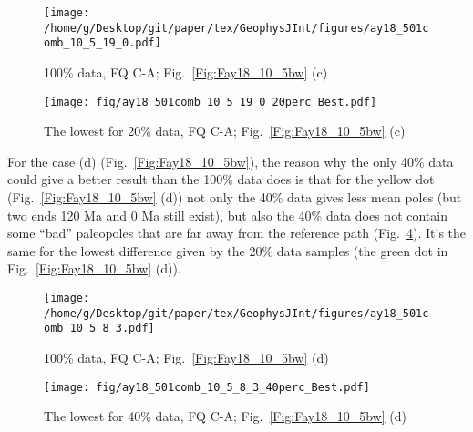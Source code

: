 \begin{figure*}[tbp]
  \captionsetup[subfigure]{labelformat=empty,aboveskip=-6pt,belowskip=-6pt}
  \centering
  \begin{subfigure}[htbp]{.49\textwidth}
    \captionsetup{skip=0pt}
    \centering
    \texttt{[image: /home/g/Desktop/git/paper/tex/GeophysJInt/figures/ay18\_501comb\_10\_5\_19\_0.pdf]}
	\caption{100\% data, FQ C-A; Fig.~\ref{Fig:Fay18_10_5bw}
	(c)}\label{Fig:Fay18_10_5b501_}
  \end{subfigure}
  \begin{subfigure}[htbp]{.49\textwidth}
    \captionsetup{skip=0pt}
    \centering
    \texttt{[image: fig/ay18\_501comb\_10\_5\_19\_0\_20perc\_Best.pdf]}  %
    \caption{The lowest for 20\% data, FQ C-A;
	Fig.~\ref{Fig:Fay18_10_5bw} (c)}\label{Fig:Fay18_10_5b501l20p}
  \end{subfigure}
  \caption[Less data, better similarity?]{Comparing the 100\% Indian
  120 Ma paleomagnetic data derived result with the best of the only
  20\% data (giving even better similarity) derived results (the dark green dot
  in Fig.~\ref{Fig:Fay18_10_5bw}
  (c)).}\label{Fig:Fay18_10_5b501l20p_vs_100p}
\end{figure*}

For the case (d) (Fig.~\ref{Fig:Fay18_10_5bw}), the reason why the only 40\%
data could give a better result than the 100\% data does is that for the yellow
dot (Fig.~\ref{Fig:Fay18_10_5bw} (d)) not only the 40\% data gives less mean
poles (but two ends 120 Ma and 0 Ma still exist), but also the 40\% data does
not contain some ``bad'' paleopoles that are far away from the reference path
(Fig.~\ref{Fig:Fay18_10_5w501l40p}). It's the same for the lowest difference
given by the 20\% data samples (the green dot in Fig.~\ref{Fig:Fay18_10_5bw}
(d)).

\begin{figure*}[tbp]
  \captionsetup[subfigure]{labelformat=empty,aboveskip=-6pt,belowskip=-6pt}
  \centering
  \begin{subfigure}[htbp]{.49\textwidth}
    \captionsetup{skip=0pt}
    \centering
    \texttt{[image: /home/g/Desktop/git/paper/tex/GeophysJInt/figures/ay18\_501comb\_10\_5\_8\_3.pdf]}
	\caption{100\% data, FQ C-A; Fig.~\ref{Fig:Fay18_10_5bw}
	(d)}\label{Fig:Fay18_10_5w501}
  \end{subfigure}
  \begin{subfigure}[htbp]{.49\textwidth}
    \captionsetup{skip=0pt}
    \centering
    \texttt{[image: fig/ay18\_501comb\_10\_5\_8\_3\_40perc\_Best.pdf]}  %
    \caption{The lowest for 40\% data, FQ C-A;
	Fig.~\ref{Fig:Fay18_10_5bw} (d)}\label{Fig:Fay18_10_5w501l40p}
  \end{subfigure}
  \caption[Less data, better similarity?]{Comparing the 100\% Indian
  120 Ma paleomagnetic data derived result with the best of the only
  40\% data (giving even better similarity) derived results (the green dot in
  Fig.~\ref{Fig:Fay18_10_5bw} (d)).}\label{Fig:Fay18_10_5w501l40p_vs_100p}
\end{figure*}

